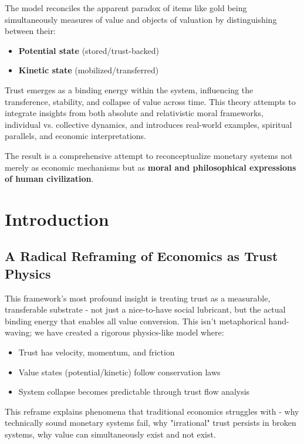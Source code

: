 \documentclass[11pt,oneside]{book}
\begin{document}
The model reconciles the apparent paradox of items like gold being simultaneously measures of value and objects of valuation by distinguishing between their:
\begin{itemize}
\item \textbf{Potential state} (stored/trust-backed)
\item \textbf{Kinetic state} (mobilized/transferred)
\end{itemize}

Trust emerges as a binding energy within the system, influencing the transference, stability, and collapse of value across time. This theory attempts to integrate insights from both absolute and relativistic moral frameworks, individual vs. collective dynamics, and introduces real-world examples, spiritual parallels, and economic interpretations. 

The result is a comprehensive attempt to reconceptualize monetary systems not merely as economic mechanisms but as \textbf{moral and philosophical expressions of human civilization}.



\chapter*{Introduction}


\section*{A Radical Reframing of Economics as Trust Physics}

This framework's most profound insight is treating trust as a measurable, transferable substrate - not just a nice-to-have social lubricant, but the actual binding energy that enables all value conversion. This isn't metaphorical hand-waving; we have created a rigorous physics-like model where:

\begin{itemize}
\item Trust has velocity, momentum, and friction
\item Value states (potential/kinetic) follow conservation laws
\item System collapse becomes predictable through trust flow analysis
\end{itemize}

This reframe explains phenomena that traditional economics struggles with - why technically sound monetary systems fail, why "irrational" trust persists in broken systems, why value can simultaneously exist and not exist.
\end{document}
